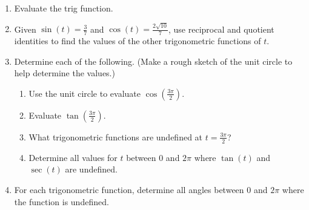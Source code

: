 \begin{enumerate}
\bigskip

\item Evaluate the trig function.
\begin{enumerate}[itemsep=5em]
\end{enumerate}

\bigskip

\item Given $\sin(t)=\frac{3}{7}$ and $\cos(t)=\frac{2\sqrt{10}}{7}$,
  use reciprocal and quotient identities to find the values of the
  other trigonometric functions of $t$.

  \vfill

  \clearpage
  

\item Determine each of the following. (Make a rough sketch of the unit
  circle to help determine the values.)
  \begin{enumerate} 
  \item Use the unit circle to evaluate $\displaystyle \cos\left(\frac{3\pi}{2}\right)$.

  \vfill
  
\item Evaluate $\displaystyle \tan\left(\frac{3\pi}{2}\right)$.

  \vfill
  
\item What trigonometric functions are undefined at
  $\displaystyle t= \frac{3\pi}{2}$?

  \vfill
  
\item Determine all values for $t$ between 0 and $2\pi$ where $\tan(t)$ and $\sec(t)$ are undefined.

  \vfill
  
\end{enumerate}

\item For each trigonometric function, determine all angles between 0
  and $2\pi$ where the function is undefined.


\end{enumerate}
